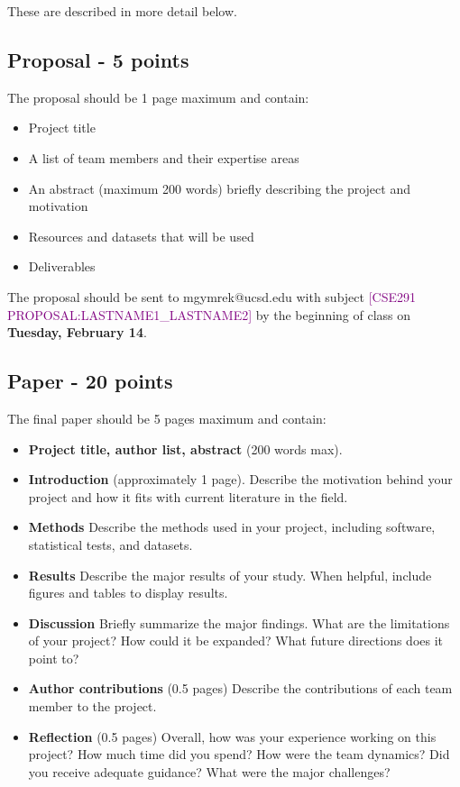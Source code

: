 \documentclass[12pt]{article}
\begin{document}
These are described in more detail below.

\subsection*{Proposal - 5 points}
The proposal should be 1 page maximum and contain:
\begin{itemize}
\setlength\itemsep{0.0em}
\item Project title
\item A list of team members and their expertise areas
\item An abstract (maximum 200 words) briefly describing the project and motivation
\item Resources and datasets that will be used
\item Deliverables
\end{itemize}

The proposal should be sent to mgymrek@ucsd.edu with subject \textcolor{purple}{[CSE291 PROPOSAL:LASTNAME1\_LASTNAME2]} by the beginning of class on \textbf{Tuesday, February 14}. 

\subsection*{Paper - 20 points}
The final paper should be 5 pages maximum and contain:
\begin{itemize}
\setlength\itemsep{0.0em}
\item \textbf{Project title, author list, abstract} (200 words max).
\item \textbf{Introduction} (approximately 1 page). Describe the motivation behind your project and how it fits with current literature in the field.
\item \textbf{Methods} Describe the methods used in your project, including software, statistical tests, and datasets.
\item \textbf{Results} Describe the major results of your study. When helpful, include figures and tables to display results.
\item \textbf{Discussion} Briefly summarize the major findings. What are the limitations of your project? How could it be expanded? What future directions does it point to?
\item \textbf{Author contributions} (0.5 pages) Describe the contributions of each team member to the project. 
\item \textbf{Reflection} (0.5 pages) Overall, how was your experience working on this project? How much time did you spend? How were the team dynamics? Did you receive adequate guidance? What were the major challenges?
\end{itemize}
\end{document}
